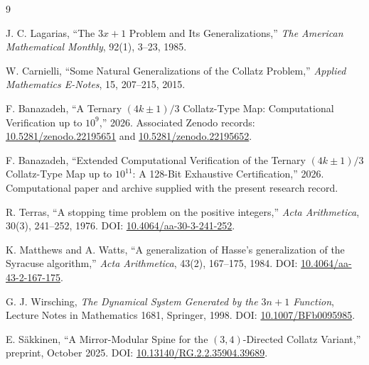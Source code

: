 \documentclass[11pt]{article}
\theoremstyle{definition}
\theoremstyle{remark}
\begin{document}
\begin{thebibliography}{9}\sloppy

J. C. Lagarias,
``The $3x+1$ Problem and Its Generalizations,''
\emph{The American Mathematical Monthly},
92(1), 3--23, 1985.

W. Carnielli,
``Some Natural Generalizations of the Collatz Problem,''
\emph{Applied Mathematics E-Notes},
15, 207--215, 2015.

F. Banazadeh,
``A Ternary $(4k\pm1)/3$ Collatz-Type Map: Computational Verification up to $10^9$,''
2026.
Associated Zenodo records:
\href{https://doi.org/10.5281/zenodo.22195651}{10.5281/zenodo.22195651} and
\href{https://doi.org/10.5281/zenodo.22195652}{10.5281/zenodo.22195652}.

F. Banazadeh,
``Extended Computational Verification of the Ternary $(4k\pm1)/3$ Collatz-Type Map up to $10^{11}$: A 128-Bit Exhaustive Certification,''
2026.  Computational paper and archive supplied with the present research record.


R. Terras,
``A stopping time problem on the positive integers,''
\emph{Acta Arithmetica}, 30(3), 241--252, 1976.
DOI: \href{https://doi.org/10.4064/aa-30-3-241-252}{10.4064/aa-30-3-241-252}.

K. Matthews and A. Watts,
``A generalization of Hasse's generalization of the Syracuse algorithm,''
\emph{Acta Arithmetica}, 43(2), 167--175, 1984.
DOI: \href{https://doi.org/10.4064/aa-43-2-167-175}{10.4064/aa-43-2-167-175}.

G. J. Wirsching,
\emph{The Dynamical System Generated by the $3n+1$ Function},
Lecture Notes in Mathematics 1681, Springer, 1998.
DOI: \href{https://doi.org/10.1007/BFb0095985}{10.1007/BFb0095985}.

E. S{\"a}kkinen,
``A Mirror-Modular Spine for the $(3,4)$-Directed Collatz Variant,''
preprint, October 2025.
DOI: \href{https://doi.org/10.13140/RG.2.2.35904.39689}{10.13140/RG.2.2.35904.39689}.

\end{thebibliography}
\end{document}
